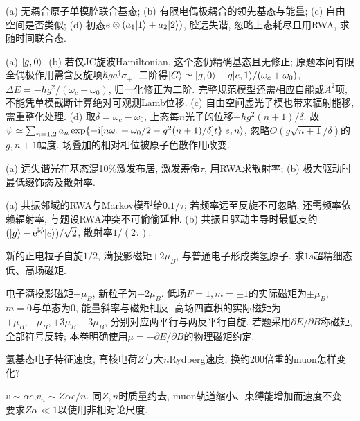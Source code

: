 \begin{exercise}(a) 无耦合原子单模腔联合基态; (b) 有限电偶极耦合的领先基态与能量; (c) 自由空间是否类似; (d) 初态$e\otimes(a_1\lvert 1\rangle+a_2\lvert 2\rangle)$, 腔远失谐, 忽略上态耗尽且用RWA, 求随时间联合态.\end{exercise}
\begin{solution}(a) $\lvert g,0\rangle$. (b) 若仅JC旋波Hamiltonian, 这个态仍精确基态且无修正; 原题本问有限全偶极作用需含反旋项$\hbar g a^\dagger\sigma_+$. 二阶得$\lvert G\rangle\simeq\lvert g,0\rangle-g\lvert e,1\rangle/(\omega_c+\omega_0)$, $\Delta E=-\hbar g^2/(\omega_c+\omega_0)$, 归一化修正为二阶. 完整规范模型还需相应自能或$A^2$项, 不能凭单模截断计算绝对可观测Lamb位移. (c) 自由空间虚光子模也带来辐射能移, 需重整化处理. (d) 取$\delta=\omega_c-\omega_0$, 上态每$n$光子的位移$-\hbar g^2(n+1)/\delta$. 故$\psi\simeq\sum_{n=1,2}a_n\exp\{-\mathrm i[n\omega_c+\omega_0/2-g^2(n+1)/\delta]t\}\lvert e,n\rangle$, 忽略$O(g\sqrt{n+1}/\delta)$的$g,n+1$幅度. 场叠加的相对相位被原子色散作用改变.
\end{solution}
\begin{exercise}(a) 远失谐光在基态混10\%激发布居, 激发寿命$\tau$, 用RWA求散射率; (b) 极大驱动时最低缀饰态及散射率.\end{exercise}
\begin{solution}(a) 共振邻域的RWA与Markov模型给$0.1/\tau$; 若频率远至反旋不可忽略, 还需频率依赖辐射率, 与题设RWA冲突不可偷偷延伸. (b) 共振且驱动主导时最低支约$(\lvert g\rangle-\mathrm e^{\mathrm i\phi}\lvert e\rangle)/\sqrt2$, 散射率$1/(2\tau)$.
\end{solution}
\begin{exercise}新的正电粒子自旋$1/2$, 满投影磁矩$+2\mu_B$, 与普通电子形成类氢原子. 求$1s$超精细态低、高场磁矩.\end{exercise}
\begin{solution}电子满投影磁矩$-\mu_B$, 新粒子为$+2\mu_B$. 低场$F=1,m=\pm1$的实际磁矩为$\pm\mu_B$, $m=0$与单态为0, 能量斜率与磁矩相反. 高场四直积的实际磁矩为$+\mu_B,-\mu_B,+3\mu_B,-3\mu_B$, 分别对应两平行与两反平行自旋. 若题采用$\partial E/\partial B$称磁矩, 全部符号反转; 本卷明确使用$\mu=-\partial E/\partial B$的物理磁矩约定.
\end{solution}
\begin{exercise}氢基态电子特征速度, 高核电荷$Z$与大$n$Rydberg速度, 换约200倍重的muon怎样变化?\end{exercise}
\begin{solution}$v\sim\alpha c$,$v_n\sim Z\alpha c/n$. 同$Z,n$时质量约去, muon轨道缩小、束缚能增加而速度不变. 要求$Z\alpha\ll1$以使用非相对论尺度.
\end{solution}

